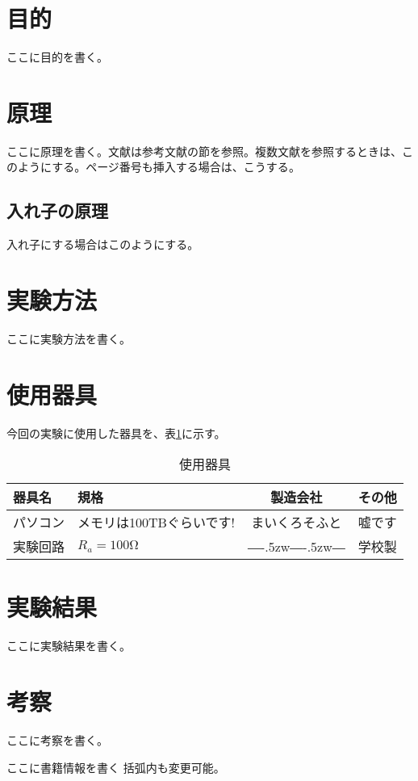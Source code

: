 \documentclass[a4j,10pt]{jsarticle}
\newenvironment{aitems}[2]{%
\begin{table}[htbp]
	\begin{center}
		\caption{使用#1}
		\label{#2}
		\begin{tabular}{l|l|c|l}
			\hline
			#1名 & 規格 & 製造会社 & その他 \\
			\hline
}{%
			\hline
		\end{tabular}
	\end{center}
\end{table}
}
\newcommand{\aline}[4]{#1 & #2 & #3 & #4 \\}
\newcommand{\mysection}[2]{\section{#1}\label{#2}}
\newcommand{\mysubsection}[2]{\subsection{#1}\label{#2}}
\def\――{―\kern-.5zw―\kern-.5zw―}
\newcommand{\FRAC}[2]{\leavevmode\kern.1em
	\raise.5ex\hbox{\the\scriptfont0 #1}\kern-.1em
	/\kern-.15em\lower.25ex\hbox{\the\scriptfont0 #2}}
\newif\ifpre
\begin{document}
\markboth{}{}
\ifpre\else
\begin{abstract}
\thispagestyle{empty}
\setlength{\baselineskip}{1.75zw}
$\FRAC{2}{5}$ここに概要を書く。両脇が空くのは\LaTeX 側の仕様なので、気になるようならば、\verb|\section*{概要}|
のように書く。
\end{abstract}
\newpage
\addtocounter{page}{-1}
\fi
\mysection{目的}{sec:purpose}

ここに目的を書く。


\mysection{原理}{sec:theory}

ここに原理を書く。文献は参考文献の節を参照\cite{アイテム}。複数文献を参照するときは、このようにする\cite{アイテム,新}。ページ番号も挿入する場合は、こうする\cite[pp.9--44]{新}。


\mysubsection{入れ子の原理}{sec:theory:ireko}

入れ子にする場合はこのようにする。


\mysection{実験方法}{sec:way}

ここに実験方法を書く。


\ifpre\else
\mysection{使用器具}{sec:item}
%
今回の実験に使用した器具を、表\ref{tab:item}に示す。

\begin{aitems}{器具}{tab:item}
	\aline{パソコン}{メモリは100TBぐらいです!}{まいくろそふと}{嘘です}
	\aline{実験回路}{$R_a=100\mathrm{\Omega}$}{\――}{学校製}
\end{aitems}



\mysection{実験結果}{sec:result}

ここに実験結果を書く。


\mysection{考察}{sec:study}

ここに考察を書く。


\begin{thebibliography}{New99}
 ここに書籍情報を書く
 括弧内も変更可能。
\end{thebibliography}

\fi
\end{document}
